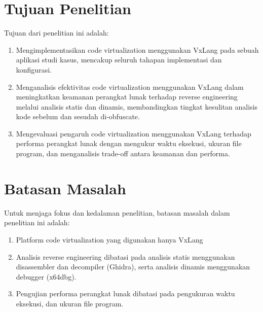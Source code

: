 \section{Tujuan Penelitian}
Tujuan dari penelitian ini adalah:

\begin{enumerate}
	\item Mengimplementasikan code virtualization menggunakan VxLang pada sebuah aplikasi studi kasus, mencakup seluruh tahapan implementasi dan konfigurasi.
	\item Menganalisis efektivitas code virtualization menggunakan VxLang dalam meningkatkan keamanan perangkat lunak terhadap reverse engineering melalui analisis statis dan dinamis, membandingkan tingkat kesulitan analisis kode sebelum dan sesudah di-obfuscate.

	\item Mengevaluasi pengaruh code virtualization menggunakan VxLang terhadap performa perangkat lunak dengan mengukur waktu eksekusi, ukuran file program, dan menganalisis trade-off antara keamanan dan performa.

\end{enumerate}

\section{Batasan Masalah}
Untuk menjaga fokus dan kedalaman penelitian, batasan masalah dalam penelitian ini adalah:
\begin{enumerate}

	\item Platform code virtualization yang digunakan hanya VxLang

	\item Analisis reverse engineering dibatasi pada analisis statis menggunakan disassembler dan decompiler (Ghidra), serta analisis dinamis menggunakan debugger (x64dbg).

	\item Pengujian performa perangkat lunak dibatasi pada pengukuran waktu eksekusi, dan ukuran file program.

\end{enumerate}

